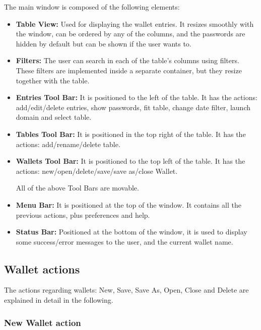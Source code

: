 The main window is composed of the following elements:

\begin{itemize}
\setlength\itemsep{-3pt}

\item \textbf{Table View:} Used for displaying the wallet entries. It resizes smoothly with the window, can be ordered by any of the columns, and the passwords are hidden by default but can be shown if the user wants to.
\item \textbf{Filters:} The user can search in each of the table's columns using filters. These filters are implemented inside a separate container, but they resize together with the table.
\item \textbf{Entries Tool Bar:} It is positioned to the left of the table. It has the actions: add/edit/delete entries, show passwords, fit table, change date filter, launch domain and select table.
\item \textbf{Tables Tool Bar:} It is positioned in the top right of the table. It has the actions: add/rename/delete table.
\item \textbf{Wallets Tool Bar:} It is positioned to the top left of the table. It has the actions: new/open/delete/save/save as/close Wallet. 

All of the above Tool Bars are movable.
\item \textbf{Menu Bar:} It is positioned at the top of the window. It contains all the previous actions, plus preferences and help.
\item \textbf{Status Bar:} Positioned at the bottom of the window, it is used to display some success/error messages to the user, and the current wallet name.
\end{itemize}

\subsection{Wallet actions}

The actions regarding wallets: New, Save, Save As, Open, Close and Delete are explained in detail in the following.

\subsubsection*{New Wallet action}


